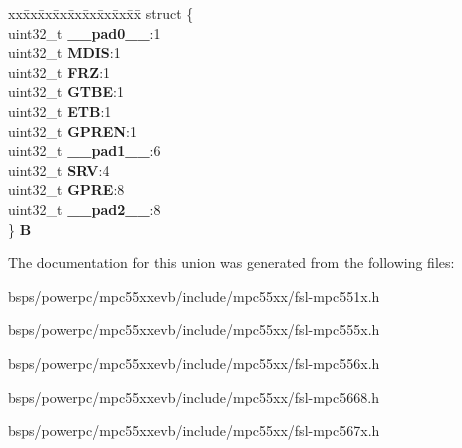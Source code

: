 \begin{DoxyCompactItemize}
\begin{tabbing}
\end{tabbing}\item 
\mbox{\label{unionEMIOS__tag_1_1EMIOS__MCR__tag_a6a0a5f7dcd81d2cf5f2853e01a4177d9}} 
\begin{tabbing}
xx\=xx\=xx\=xx\=xx\=xx\=xx\=xx\=xx\=\kill
struct \{\\
\>uint32\_t {\bfseries \_\_pad0\_\_}:1\\
\>uint32\_t {\bfseries MDIS}:1\\
\>uint32\_t {\bfseries FRZ}:1\\
\>uint32\_t {\bfseries GTBE}:1\\
\>uint32\_t {\bfseries ETB}:1\\
\>uint32\_t {\bfseries GPREN}:1\\
\>uint32\_t {\bfseries \_\_pad1\_\_}:6\\
\>uint32\_t {\bfseries SRV}:4\\
\>uint32\_t {\bfseries GPRE}:8\\
\>uint32\_t {\bfseries \_\_pad2\_\_}:8\\
\} {\bfseries B}\\

\end{tabbing}\end{DoxyCompactItemize}


The documentation for this union was generated from the following files\+:\begin{DoxyCompactItemize}
\item 
bsps/powerpc/mpc55xxevb/include/mpc55xx/fsl-\/mpc551x.\+h\item 
bsps/powerpc/mpc55xxevb/include/mpc55xx/fsl-\/mpc555x.\+h\item 
bsps/powerpc/mpc55xxevb/include/mpc55xx/fsl-\/mpc556x.\+h\item 
bsps/powerpc/mpc55xxevb/include/mpc55xx/fsl-\/mpc5668.\+h\item 
bsps/powerpc/mpc55xxevb/include/mpc55xx/fsl-\/mpc567x.\+h\end{DoxyCompactItemize}

